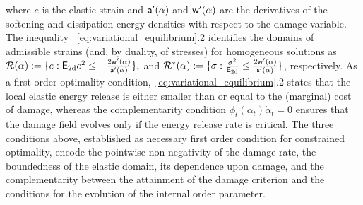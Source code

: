 where $e$ is the elastic strain and $\mathsf{a}'(\alpha)$ and $\mathsf{w}'(\alpha)$ are the derivatives of the softening and dissipation energy densities with respect to the damage variable.
The inequality ~\eqref{eq:variational_equilibrium}.2 identifies the domains of admissible strains (and, by duality, of stresses) for homogeneous solutions as
$\mathcal{R}(\alpha):=\{e: \mathsf{E_{\text{2d}}} e^2 \leq -\frac{2 \mathsf{w}'(\alpha)}{\mathsf{a}'(\alpha)}\},$ and $
\mathcal{R}^*(\alpha):=\{\sigma: \frac{\sigma^2}{\mathsf{E_{\text{2d}}}} \leq \frac{2 \mathsf{w}'(\alpha)}{\mathsf{s}'(\alpha)}\}$, respectively.
% 
As a first order optimality condition,~\eqref{eq:variational_equilibrium}.2 states that the local elastic energy release is either smaller than or equal to the (marginal) cost of damage, whereas the complementarity condition $\phi_t(\alpha_t)\dot \alpha_t = 0$ ensures that the damage field evolves only if the energy release rate is critical.
The three conditions above, established as necessary first order condition for constrained optimality, encode the pointwise non-negativity of the damage rate, the boundedness of the elastic domain, its dependence upon damage, and the complementarity between the attainment of the damage criterion and the conditions for the evolution of the internal order parameter. 

